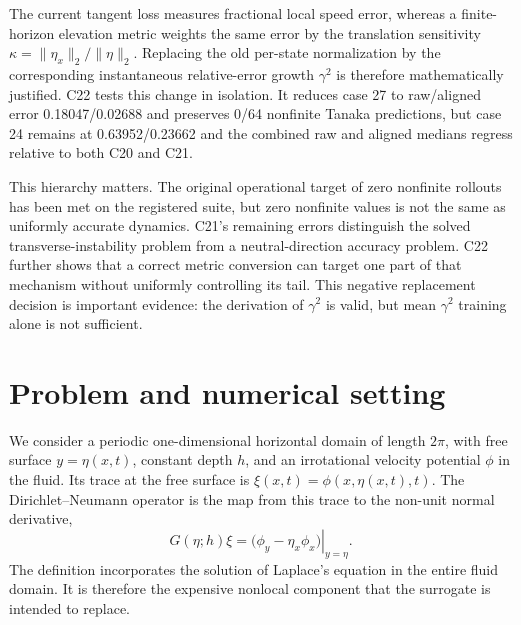 \documentclass[11pt]{article}
\begin{document}
\begin{description}[style=nextline,leftmargin=0pt]
\item[Completed phase-normalization ablation:]
The current tangent loss measures fractional local speed error, whereas a
finite-horizon elevation metric weights the same error by the translation
sensitivity \(\kappa=\|\eta_x\|_2/\|\eta\|_2\).  Replacing the old per-state
normalization by the corresponding instantaneous relative-error growth
\(\gamma^2\) is therefore mathematically justified.  C22 tests this change in
isolation.  It reduces case 27 to raw/aligned error 0.18047/0.02688 and preserves
0/64 nonfinite Tanaka predictions, but case 24 remains at 0.63952/0.23662 and
the combined raw and aligned medians regress relative to both C20 and C21.
\end{description}

This hierarchy matters.  The original operational target of zero nonfinite
rollouts has been met on the registered suite, but zero nonfinite values is not
the same as uniformly accurate dynamics.  C21's remaining errors distinguish
the solved transverse-instability problem from a neutral-direction accuracy
problem.  C22 further shows that a correct metric conversion can target one
part of that mechanism without uniformly controlling its tail.  This negative
replacement decision is important evidence: the derivation of \(\gamma^2\) is
valid, but mean \(\gamma^2\) training alone is not sufficient.

\section{Problem and numerical setting}

We consider a periodic one-dimensional horizontal domain of length \(2\pi\),
with free surface \(y=\eta(x,t)\), constant depth \(h\), and an irrotational
velocity potential \(\phi\) in the fluid.  Its trace at the free surface is
\(\xi(x,t)=\phi(x,\eta(x,t),t)\).  The Dirichlet--Neumann operator is the map
from this trace to the non-unit normal derivative,
\begin{equation}
 G(\eta;h)\xi
 =\left.\bigl(\phi_y-\eta_x\phi_x\bigr)\right|_{y=\eta}.
 \label{eq:dno-definition}
\end{equation}
The definition incorporates the solution of Laplace's equation in the entire
fluid domain.  It is therefore the expensive nonlocal component that the
surrogate is intended to replace.
\end{document}
